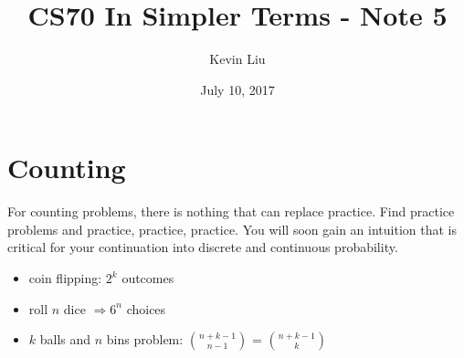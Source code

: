 \documentclass[a4paper]{article}
\title{CS70 In Simpler Terms - Note 5}
\author{Kevin Liu}
\date{July 10, 2017}
\begin{document}
\maketitle

\section{Counting}
For counting problems, there is nothing that can replace practice. Find practice problems and practice, practice, practice. You will soon gain an intuition that is critical for your continuation into discrete and continuous probability. 
\begin{itemize}
    \item coin flipping: $2^k$ outcomes
    \item roll $n$ dice $\Rightarrow 6^n$ choices
    \item $k$ balls and $n$ bins problem: $n+k-1 \choose n-1$ = $n+k-1 \choose k$

\end{itemize}
\end{document}
